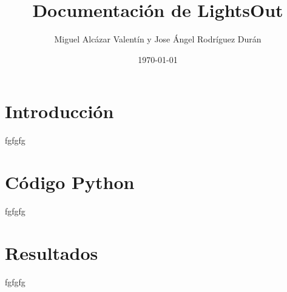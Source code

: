 \documentclass[a4paper, 12pt]{article}
\title{Documentación de LightsOut }
\author{Miguel Alcázar Valentín y Jose Ángel Rodríguez Durán}
\date{\today}
\begin{document}
\maketitle
\tableofcontents  %

\section{Introducción}
fgfgfg

\section{Código Python}
fgfgfg

\section{Resultados}
fgfgfg
\end{document}
